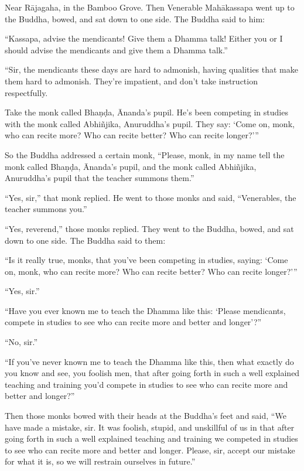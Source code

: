 \documentclass[12pt,openany]{book}%
\begin{document}
Near \textsanskrit{Rājagaha}, in the Bamboo Grove. Then Venerable \textsanskrit{Mahākassapa} went up to the Buddha, bowed, and sat down to one side. The Buddha said to him: 

“Kassapa, advise the mendicants! Give them a Dhamma talk! Either you or I should advise the mendicants and give them a Dhamma talk.” 

“Sir, the mendicants these days are hard to admonish, having qualities that make them hard to admonish. They’re impatient, and don’t take instruction respectfully. 

Take the monk called \textsanskrit{Bhaṇḍa}, Ānanda’s pupil. He’s been competing in studies with the monk called \textsanskrit{Abhiñjika}, Anuruddha’s pupil. They say: ‘Come on, monk, who can recite more? Who can recite better? Who can recite longer?’” 

So the Buddha addressed a certain monk, “Please, monk, in my name tell the monk called \textsanskrit{Bhaṇḍa}, Ānanda’s pupil, and the monk called \textsanskrit{Abhiñjika}, Anuruddha’s pupil that the teacher summons them.” 

“Yes, sir,” that monk replied. He went to those monks and said, “Venerables, the teacher summons you.” 

“Yes, reverend,” those monks replied. They went to the Buddha, bowed, and sat down to one side. The Buddha said to them: 

“Is it really true, monks, that you’ve been competing in studies, saying: ‘Come on, monk, who can recite more? Who can recite better? Who can recite longer?’” 

“Yes, sir.” 

“Have you ever known me to teach the Dhamma like this: ‘Please mendicants, compete in studies to see who can recite more and better and longer’?” 

“No, sir.” 

“If you’ve never known me to teach the Dhamma like this, then what exactly do you know and see, you foolish men, that after going forth in such a well explained teaching and training you’d compete in studies to see who can recite more and better and longer?” 

Then those monks bowed with their heads at the Buddha’s feet and said, “We have made a mistake, sir. It was foolish, stupid, and unskillful of us in that after going forth in such a well explained teaching and training we competed in studies to see who can recite more and better and longer. Please, sir, accept our mistake for what it is, so we will restrain ourselves in future.” 
\end{document}
